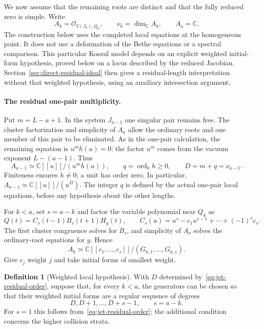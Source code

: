 \documentclass[11pt]{article}
\theoremstyle{definition}
\newtheorem{definition}[proposition]{Definition}
\newcommand{\C}{\mathbb C}
\newcommand{\ord}{\operatorname{ord}}
\begin{document}
We now assume that the remaining roots are distinct and that the fully
reduced zero is simple. Write
\[
 A_k=\mathcal O_{V(J_k),Q_k},\qquad \nu_k=\dim_\C A_k,
 \qquad A_a=\C.
\]
The construction below uses the completed local equations at the
homogeneous point. It does not use a deformation of the Bethe equations
or a spectral comparison. This particular Koszul model depends on an
explicit weighted initial-form hypothesis, proved below on a locus
described by the reduced Jacobian. Section~\ref{sec:direct-residual-ideal}
then gives a residual-length interpretation without that weighted
hypothesis, using an auxiliary intersection argument.

\paragraph{The residual one-pair multiplicity.}
Put $m=L-a+1$. In the system $J_{a-1}$ one singular pair remains free.
The cluster factorization and simplicity of $A_a$ allow the ordinary
roots and one member of this pair to be eliminated. As in the one-pair
calculation, the remaining equation is $u^m h(u)=0$: the factor $u^m$
comes from the vacuum exponent $L-(a-1)$. Thus
\begin{equation}\label{eq:jet-residual-order}
 A_{a-1}\simeq\C[[u]]/(u^m h(u)),\qquad
 q=\ord_0h\ge0,\qquad D=m+q=\nu_{a-1}.
\end{equation}
Finiteness ensures $h\ne0$; a unit has order zero. In particular,
$A_{a-1}\simeq\C[[u]]/(u^D)$. The integer $q$ is defined by the actual
one-pair local equations, before any hypothesis about the other lengths.

For $k<a$, set $s=a-k$ and factor the variable polynomial near $Q_k$ as
\[
 Q(t)=C_s(t-1)B_s(t+1)H_y(t),\qquad
 C_s(u)=u^s-c_1u^{s-1}+\cdots+(-1)^sc_s.
\]
The first cluster congruence solves for $B_s$, and simplicity of $A_a$
solves the ordinary-root equations for $y$. Hence
\[
 A_k\simeq\C[[c_1,\ldots,c_s]]/(G_{k,1},\ldots,G_{k,s}).
\]
Give $c_j$ weight $j$ and take initial forms of smallest weight.

\begin{definition}[Weighted local hypothesis]\label{def:jet-weighted-hypothesis}
With $D$ determined by~\eqref{eq:jet-residual-order}, suppose that, for
every $k<a$, the generators can be chosen so that their weighted
initial forms are a regular sequence of degrees
\begin{equation}\label{eq:jet-initial-degrees}
 D,D+1,\ldots,D+s-1,\qquad s=a-k.
\end{equation}
For $s=1$ this follows from~\eqref{eq:jet-residual-order}; the additional
condition concerns the higher collision strata.
\end{definition}
\end{document}
